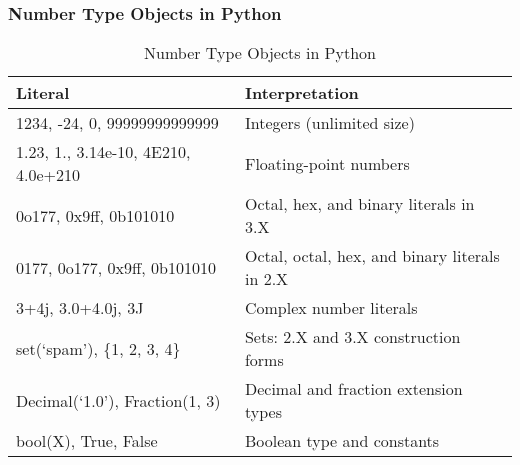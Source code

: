\documentclass[aspectratio=1610]{beamer}
\begin{document}
\begin{frame}
    \frametitle{Number Type Objects in Python}
    \begin{table}[!htbp]
    	\centering
    	\caption*{Number Type Objects in Python}
    	\label{tab:number_types_in_python}
    	\begin{tabular}{ll}
    		\toprule \toprule
    		Literal & Interpretation\\
    		\midrule
    		 1234, -24, 0, 99999999999999 & Integers (unlimited size)\\
    		 1.23, 1., 3.14e-10, 4E210, 4.0e+210 & Floating-point numbers \\
    		 0o177, 0x9ff, 0b101010 & Octal, hex, and binary literals in 3.X \\
    		 0177, 0o177, 0x9ff, 0b101010 & Octal, octal, hex, and binary literals in 2.X \\
    		 3+4j, 3.0+4.0j, 3J & Complex number literals \\
    		 set(`spam'), \{1, 2, 3, 4\} & Sets: 2.X and 3.X construction forms\\ Decimal(`1.0'), Fraction(1, 3) & Decimal and fraction extension types\\
    		 bool(X), True, False & Boolean type and constants\\
    		 \bottomrule
    	\end{tabular}
    \end{table}
\end{frame}
\end{document}
